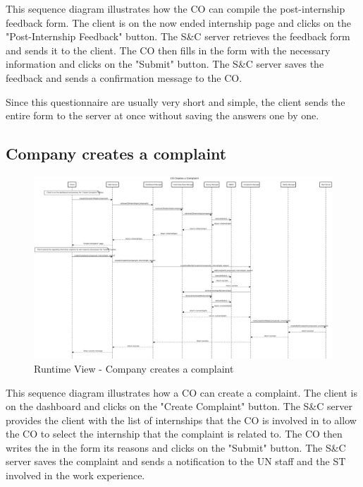 \par This sequence diagram illustrates how the CO can compile the post-internship feedback form. The client is on the
now ended internship page and clicks on the "Post-Internship Feedback" button. The S\&C server retrieves the feedback
form and sends it to the client. The CO then fills in the form with the necessary information and clicks on the
"Submit" button. The S\&C server saves the feedback and sends a confirmation message to the CO.

\par Since this questionnaire are usually very short and simple, the client sends the entire form to the server at
once without saving the answers one by one.

\subsection{Company creates a complaint}
\label{sub:company-creates-a-complaint}%

\begin{figure}[H]
      \centering
      \includegraphics[width=1.0\textwidth]{Images/RV_11.pdf}
      \caption{Runtime View - Company creates a complaint}
      \label{fig:rv-co-creates-complaint}
\end{figure}

\par This sequence diagram illustrates how a CO can create a complaint. The client is on the dashboard and clicks
on the "Create Complaint" button. The S\&C server provides the client with the list of internships that the CO is
involved in to allow the CO to select the internship that the complaint is related to. The CO then writes the in the
form its reasons and clicks on the "Submit" button. The S\&C server saves the complaint and sends a notification to
the UN staff and the ST involved in the work experience.

